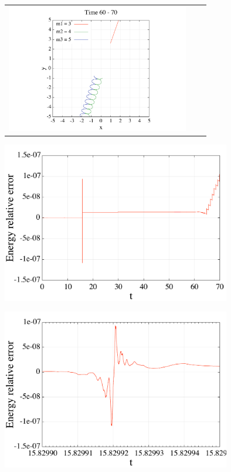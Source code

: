 \documentclass[11pt,a4paper,oneside,onecolumn]{jarticle}
\begin{document}
\begin{figure}[H]
\begin{tabular}{ccc}
%
\begin{minipage}[t]{0.45\hsize}
\centering
\includegraphics[width=8cm]{./image/pythagoras_orbit_60to70.pdf}
\end{minipage}
\end{tabular}
\caption{\label{}}
\end{figure}


\begin{figure}[H]
\centering
\includegraphics[width=10cm]{./image/pythagoras_E_error.pdf}
\caption{\label{}}
\end{figure}

\begin{figure}[H]
\centering
\includegraphics[width=10cm]{./image/pythagoras_E_error_detail.pdf}
\caption{\label{}}
\end{figure}
\end{document}
